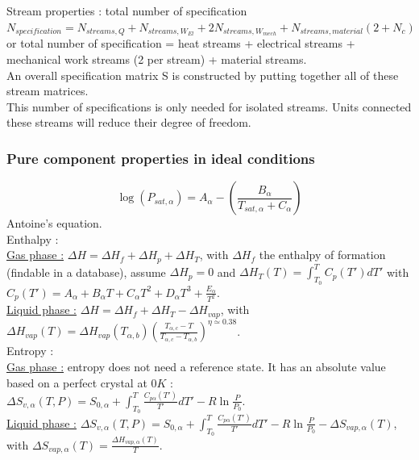 \documentclass[../main.tex]{subfiles}
\begin{document}
Stream properties : total number of specification $N_{specification} = N_{streams, Q} + N_{streams, W_{El}} + 2 N_{streams, W_{mech}} + N_{streams, material} (2+N_c)$ or total number of specification = heat streams + electrical streams + mechanical work streams (2 per stream) + material streams.\\
An overall specification matrix S is constructed by putting together all of these stream matrices.\\
\warning This number of specifications is only needed for isolated streams. Units connected these streams will reduce their degree of freedom.\\

\subsubsection{Pure component properties in ideal conditions}
\begin{equation}
\log(P_{sat,\alpha}) = A_\alpha - (\frac{B_\alpha}{T_{sat,\alpha} + C_\alpha})
\end{equation}
Antoine's equation.\\

Enthalpy :\\
\quad \underline{Gas phase :} $\Delta H = \Delta H_f + \Delta H_p + \Delta H_T$, with $\Delta H_f$ the enthalpy of formation (findable in a database), assume $\Delta H_p = 0$ and $\Delta H_T(T) = \int_{T_0}^T C_p(T')dT'$ with $C_p(T') = A_\alpha + B_\alpha T + C_\alpha T^2 + D_\alpha T^3 + \frac{E_\alpha}{T^2}$.\\

\quad \underline{Liquid phase :} $\Delta H = \Delta H_f + \Delta H_T - \Delta H_{vap}$, with $\Delta H_{vap}(T) = \Delta H_{vap} (T_{\alpha,b}) (\frac{T_{\alpha,c} - T}{T_{\alpha,c}-T_{\alpha,b}})^{\eta\simeq 0.38} $.\\

Entropy :\\
\quad \underline{Gas phase :} entropy does not need a reference state. It has an absolute value based on a perfect crystal at $0K$ : $\Delta S_{v,\alpha} (T,P) = S_{0,\alpha} + \int_{T_0}^T \frac{C_{p\alpha} (T')}{T'} dT' - R\ln \frac{P}{P_0}$.\\

\quad \underline{Liquid phase :} $\Delta S_{v,\alpha} (T,P) = S_{0,\alpha} + \int_{T_0}^T \frac{C_{p\alpha} (T')}{T'} dT' - R\ln \frac{P}{P_0} - \Delta S_{vap,\alpha} (T)$, with $\Delta S_{vap,\alpha} (T) = \frac{\Delta H_{vap,\alpha}(T)}{T}$.\\
\end{document}
